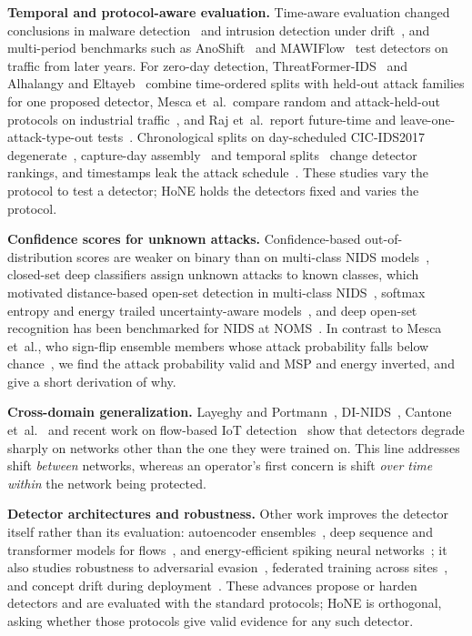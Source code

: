 \documentclass[conference]{IEEEtran}
\begin{document}
\textbf{Temporal and protocol-aware evaluation.} Time-aware evaluation changed conclusions in malware detection~\cite{pendlebury2019} and intrusion detection under drift~\cite{andresini2021}, and multi-period benchmarks such as AnoShift~\cite{dragoi2022} and MAWIFlow~\cite{schraven2026} test detectors on traffic from later years. For zero-day detection, ThreatFormer-IDS~\cite{nayak2026} and Alhalangy and Eltayeb~\cite{alhalangy2026} combine time-ordered splits with held-out attack families for one proposed detector, Mesca et~al.\ compare random and attack-held-out protocols on industrial traffic~\cite{mesca2026}, and Raj et~al.\ report future-time and leave-one-attack-type-out tests~\cite{raj2026}. Chronological splits on day-scheduled CIC-IDS2017 degenerate~\cite{moczkodan2026}, capture-day assembly~\cite{youssef2026} and temporal splits~\cite{abdessamad2026} change detector rankings, and timestamps leak the attack schedule~\cite{sakr2026}. These studies vary the protocol to test a detector; HoNE holds the detectors fixed and varies the protocol.

\textbf{Confidence scores for unknown attacks.} Confidence-based out-of-distribution scores are weaker on binary than on multi-class NIDS models~\cite{corsini2023}, closed-set deep classifiers assign unknown attacks to known classes, which motivated distance-based open-set detection in multi-class NIDS~\cite{zhang2021}, softmax entropy and energy trailed uncertainty-aware models~\cite{talpini2024}, and deep open-set recognition has been benchmarked for NIDS at NOMS~\cite{baye2023}. In contrast to Mesca et~al., who sign-flip ensemble members whose attack probability falls below chance~\cite{mesca2026}, we find the attack probability valid and MSP and energy inverted, and give a short derivation of why.

\textbf{Cross-domain generalization.} Layeghy and Portmann~\cite{layeghy2023xdomain}, DI-NIDS~\cite{layeghy2023dinids}, Cantone et~al.~\cite{cantone2024} and recent work on flow-based IoT detection~\cite{martinez2026} show that detectors degrade sharply on networks other than the one they were trained on. This line addresses shift \emph{between} networks, whereas an operator's first concern is shift \emph{over time within} the network being protected.

\textbf{Detector architectures and robustness.} Other work improves the detector itself rather than its evaluation: autoencoder ensembles~\cite{mirsky2018}, deep sequence and transformer models for flows~\cite{fernandez2026,manocchio2024}, and energy-efficient spiking neural networks~\cite{wang2024snn,knapp2025}; it also studies robustness to adversarial evasion~\cite{liu2026netmasq}, federated training across sites~\cite{xu2026entente}, and concept drift during deployment~\cite{depaola2026,yang2021cade}. These advances propose or harden detectors and are evaluated with the standard protocols; HoNE is orthogonal, asking whether those protocols give valid evidence for any such detector.
\end{document}

